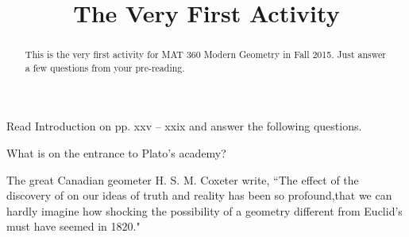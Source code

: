 \documentclass{ximera}
\title{The Very First Activity}
\begin{document}
\begin{abstract}
This is the very first activity for MAT 360 Modern Geometry in Fall 2015. Just answer a few questions from your pre-reading. 
\end{abstract}

\maketitle

Read Introduction on pp. xxv -- xxix and answer the following questions.

\bigskip
 
\begin{freeResponse}

 What is on the entrance to Plato's academy?

\end{freeResponse}


\bigskip

\begin{question}

The great Canadian geometer H. S. M. Coxeter write, 
``The effect of the discovery of \underline{\hspace{2.5cm}} \underline{\hspace{2cm}} %
on our ideas of truth and  reality has been so profound,that we can hardly imagine how shocking the possibility of a geometry different from Euclid's must have seemed in 1820."

\end{question}

\vspace{2cm}
\end{document}
